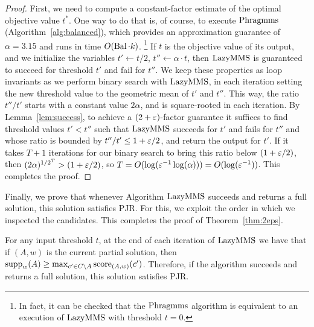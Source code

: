 \begin{proof}
First, we need to compute a constant-factor estimate of the optimal objective value $t^*$. 
One way to do that is, of course, to execute $\operatorname{Phragmms}$ (Algorithm~\ref{alg:balanced}), which provides an approximation guarantee of $\alpha=3.15$ and runs in time $O(\operatorname{Bal}\cdot k)$.%
\footnote{In fact, it can be checked that the $\operatorname{Phragmms}$ algorithm is equivalent to an execution of $\operatorname{LazyMMS}$ with threshold $t=0$.} 
If $t$ is the objective value of its output, and we initialize the variables $t'\leftarrow t/2$, $t''\leftarrow \alpha\cdot t$, then $\operatorname{LazyMMS}$ is guaranteed to succeed for threshold $t'$ and fail for $t''$. We keep these properties as loop invariants as we perform binary search with $\operatorname{LazyMMS}$, in each iteration setting the new threshold value to the geometric mean of $t'$ and $t''$. This way, the ratio $t''/t'$ starts with a constant value $2 \alpha$, and is square-rooted in each iteration. 
By Lemma~\ref{lem:success}, to achieve a $(2+\varepsilon)$-factor guarantee it suffices to find threshold values $t'<t''$ such that $\operatorname{LazyMMS}$ succeeds for $t'$ and fails for $t''$ and whose ratio is bounded by $t''/t'\leq 1+\varepsilon/2$, and return the output for $t'$. If it takes $T+1$ iterations for our binary search to bring this ratio below $(1+\varepsilon/2)$, then $(2\alpha)^{1/2^T} > (1+\varepsilon/2)$, so $T= O(\log (\varepsilon^{-1} \log(\alpha))) = O(\log(\varepsilon^{-1}))$. This completes the proof. 
\end{proof}

Finally, we prove that whenever Algorithm $\operatorname{LazyMMS}$ succeeds and returns a full solution, this solution satisfies PJR. For this, we exploit the order in which we inspected the candidates. This completes the proof of Theorem~\ref{thm:2eps}. 

\begin{lemma}
For any input threshold $t$, at the end of each iteration of $\operatorname{LazyMMS}$ we have that if $(A,w)$ is the current partial solution, then $\operatorname{supp}_w(A)\geq \max_{c'\in C\setminus A} \operatorname{score}_{(A,w)}(c')$. 
Therefore, if the algorithm succeeds and returns a full solution, this solution satisfies PJR.
\end{lemma}

